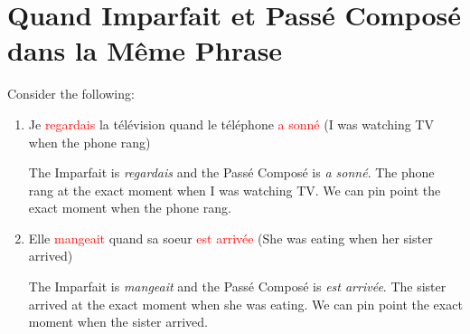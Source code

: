 \documentclass{book}
\begin{document}
\newpage

\section{Quand Imparfait et Passé Composé dans la Même Phrase}
Consider the following:
\begin{enumerate}
    \item 
    \begin{center}
        Je \textcolor{red}{regardais} la télévision quand le téléphone \textcolor{red}{a sonné} (I was watching TV when the phone rang)
    \end{center}
    The Imparfait is \textit{regardais} and the Passé Composé is \textit{a sonné}. The phone rang at the exact moment when I was watching TV. We can pin point the exact moment when the phone rang.

    \item 
    \begin{center}
        Elle \textcolor{red}{mangeait} quand sa soeur \textcolor{red}{est arrivée} (She was eating when her sister arrived)
    \end{center}
    The Imparfait is \textit{mangeait} and the Passé Composé is \textit{est arrivée}. The sister arrived at the exact moment when she was eating. We can pin point the exact moment when the sister arrived.
    
\end{enumerate}
\end{document}
